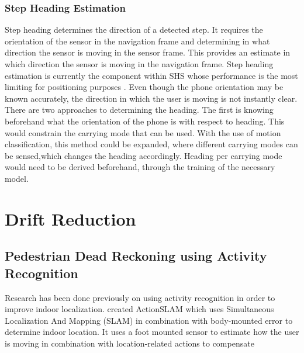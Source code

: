 \subsubsection{Step Heading Estimation}
Step heading determines the direction of a detected step. It requires the orientation of the sensor in the navigation frame and determining in what direction the sensor is moving in the sensor frame. This provides an estimate in which direction the sensor is moving in the navigation frame.  Step heading estimation is currently the component within SHS whose performance is the most limiting for positioning purposes \cite{Diez2018b, Qian2013,Combettes2017}.
Even though the phone orientation may be known accurately, the direction in which the user is moving is not instantly clear. There are two approaches to determining the heading. The first is knowing beforehand what the orientation of the phone is with respect to heading.  This would constrain the carrying mode that can be used.  With the use of motion classification, this method could be expanded, where different carrying modes can be sensed,which changes the heading accordingly. Heading per carrying mode would need to be derived beforehand, through the training of the necessary model. 

\section{Drift Reduction}

\subsection{Pedestrian Dead Reckoning using Activity Recognition}
Research has been done previously on using activity recognition in order to improve indoor localization. \citet{Hardegger2012} created ActionSLAM which uses Simultaneous Localization And Mapping (SLAM) in combination with body-mounted error to determine indoor location. It uses a foot mounted sensor to estimate how the user is moving in combination with location-related actions to compensate 



